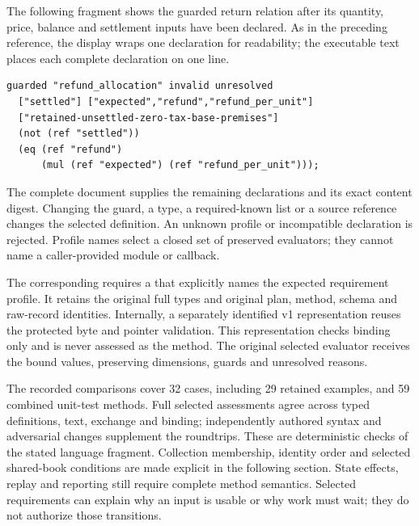 The following fragment shows the guarded return relation after its quantity,
price, balance and settlement inputs have been declared. As in the preceding
reference, the display wraps one declaration for readability; the executable
text places each complete declaration on one line.
\begin{lstlisting}
guarded "refund_allocation" invalid unresolved
  ["settled"] ["expected","refund","refund_per_unit"]
  ["retained-unsettled-zero-tax-base-premises"]
  (not (ref "settled"))
  (eq (ref "refund")
      (mul (ref "expected") (ref "refund_per_unit")));
\end{lstlisting}
The complete document supplies the remaining declarations and its exact content
digest. Changing the guard, a type, a required-known list or a source reference
changes the selected definition. An unknown profile or incompatible declaration
is rejected. Profile names select a closed set of preserved evaluators; they
cannot name a caller-provided module or callback.

The corresponding  requires a
 that explicitly names the expected requirement
profile. It retains the original full types and original plan, method, schema
and raw-record identities. Internally, a separately identified v1 representation
reuses the protected byte and pointer validation. This representation checks
binding only and is never assessed as the method. The original selected evaluator
receives the bound values, preserving dimensions, guards and unresolved reasons.

The recorded comparisons cover 32 cases, including 29 retained examples, and
59 combined unit-test methods. Full selected assessments agree across typed
definitions, text, exchange and binding; independently authored syntax and
adversarial changes supplement the roundtrips. These are deterministic checks
of the stated language fragment. Collection membership, identity order and selected shared-book conditions are
made explicit in the following section. State effects, replay and reporting
still require complete method semantics. Selected requirements can explain why
an input is usable or why work must wait; they do not authorize those transitions.


